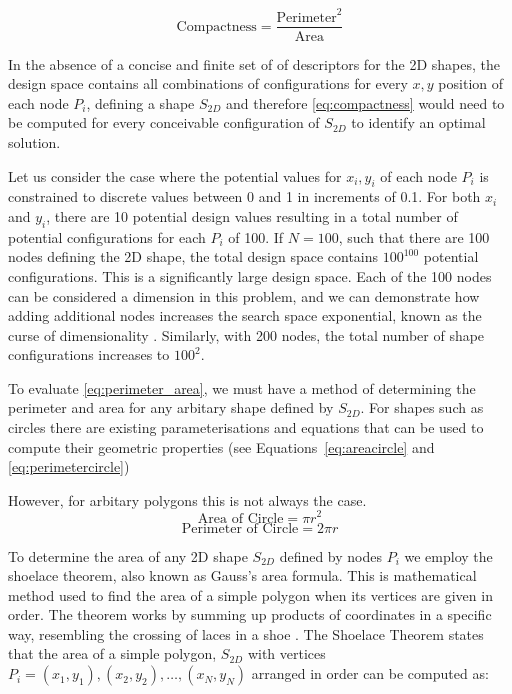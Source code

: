 \documentclass{article}
\begin{document}
\begin{equation}
    \text{Compactness}=\frac{\text{Perimeter}^2}{\text{Area}}
    \label{eq:compactness}
\end{equation}

In the absence of a concise and finite set of of descriptors for the 2D shapes, the design space contains all combinations of configurations for every $x,y$ position of each node $P_i$, defining a shape $S_{2D}$ and therefore \eqref{eq:compactness} would need to be computed for every conceivable configuration of $S_{2D}$ to identify an optimal solution.

Let us consider the case where the potential values for $x_i,y_i$ of each node $P_i$ is constrained to discrete values between 0 and 1 in increments of 0.1. For both $x_i$ and $y_i$, there are 10 potential design values resulting in a total number of potential configurations for each $P_i$ of 100. If $N=100$, such that there are 100 nodes defining the 2D shape, the total design space contains $100^{100}$ potential configurations. This is a significantly large design space. Each of the 100 nodes can be considered a dimension in this problem, and we can demonstrate how adding additional nodes increases the search space exponential, known as the curse of dimensionality \citep{Keogh2017}. Similarly, with 200 nodes, the total number of shape configurations increases to $100^2$.

To evaluate \eqref{eq:perimeter_area}, we must have a method of determining the perimeter and area for any arbitary shape defined by $S_{2D}$. For shapes such as circles there are existing parameterisations and equations that can be used to compute their geometric properties (see Equations~\eqref{eq:areacircle} and \eqref{eq:perimetercircle})

However, for arbitary polygons this is not always the case. 
\begin{equation}
    \text{Area of Circle}= \pi r^2 
    \label{eq:areacircle}
\end{equation}
\begin{equation}
    \text{Perimeter of Circle}= 2\pi r
    \label{eq:perimetercircle}
\end{equation}

To determine the area of any 2D shape $S_{2D}$ defined by nodes $P_i$ we employ the shoelace theorem, also known as Gauss's area formula. This is mathematical method used to find the area of a simple polygon when its vertices are given in order. The theorem works by summing up products of coordinates in a specific way, resembling the crossing of laces in a shoe \citep{Braden1986}.
The Shoelace Theorem states that the area of a simple polygon, $S_{2D}$ with vertices $P_i =(x_1, y_1), (x_2, y_2), \dots, (x_N, y_N)$ arranged in order can be computed as:
\end{document}
